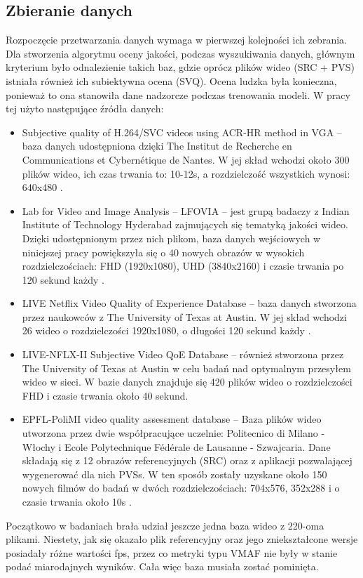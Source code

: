 \subsection{Zbieranie danych}
Rozpoczęcie przetwarzania danych wymaga w pierwszej kolejności ich zebrania. Dla stworzenia algorytmu oceny jakości, podczas wyszukiwania danych, głównym kryterium było odnalezienie takich baz, gdzie oprócz plików wideo (SRC + PVS) istniała również ich subiektywna ocena (SVQ). Ocena ludzka była konieczna, ponieważ to ona stanowiła dane nadzorcze podczas trenowania modeli. W pracy tej użyto następujące źródła danych:
\begin{itemize}
\item Subjective quality of H.264/SVC videos using ACR-HR method in VGA -- baza danych udostępniona dzięki The Institut de Recherche en Communications et Cybernétique de Nantes. W jej skład wchodzi około 300 plików wideo, ich czas trwania to: 10-12s, a rozdzielczość wszystkich wynosi: 640x480 \cite{pitrey:hal-00608310}.
\item Lab for Video and Image Analysis – LFOVIA -- jest grupą badaczy z Indian Institute of Technology Hyderabad zajmujących się tematyką jakości wideo. Dzięki udostępnionym przez nich plikom,  baza danych wejściowych w niniejszej pracy powiększyła się o 40 nowych obrazów w wysokich rozdzielczościach: FHD (1920x1080), UHD (3840x2160) i czasie trwania po 120 sekund każdy \cite{india}.
\item LIVE Netflix Video Quality of Experience Database -- baza danych stworzona przez naukowców z The University of Texas at Austin. W jej skład wchodzi 26 wideo o rozdzielczości 1920x1080, o długości 120 sekund każdy \cite{netflix_1}\cite{netflix_11}.
\item LIVE-NFLX-II Subjective Video QoE Database -- również stworzona przez The University of Texas at Austin w celu badań nad optymalnym przesyłem wideo w sieci. W bazie danych znajduje się 420 plików wideo o rozdzielczości FHD i czasie trwania około 40 sekund.
\item EPFL-PoliMI video quality assessment database -- Baza plików wideo utworzona przez dwie współpracujące uczelnie: Politecnico di Milano - Włochy i Ecole Polytechnique Fédérale de Lausanne - Szwajcaria. Dane składają się z 12 obrazów referencyjnych (SRC) oraz z aplikacji pozwalającej wygenerować dla nich PVSs. W ten sposób zostały uzyskane około 150 nowych filmów do badań w dwóch rozdzielczościach: 704x576, 352x288 i o czasie trwania około 10s \cite{italy}\cite{italy_2}\cite{italy_3}.
\end{itemize}
Początkowo w badaniach brała udział jeszcze jedna baza wideo z 220-oma plikami. Niestety, jak się okazało plik referencyjny oraz jego zniekształcone wersje posiadały różne wartości fps, przez co metryki typu VMAF nie były w stanie podać miarodajnych wyników. Cała więc baza musiała zostać pominięta.\par

